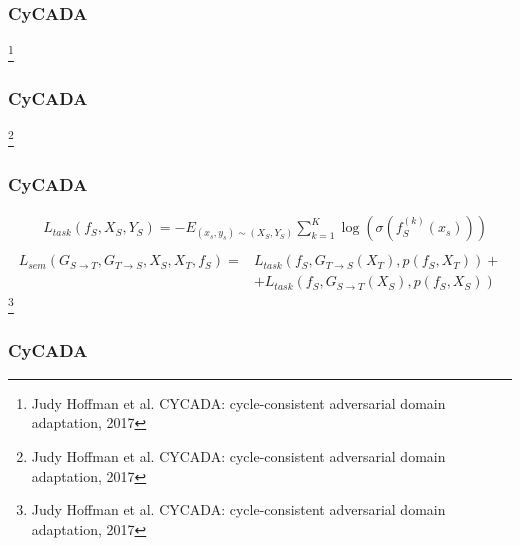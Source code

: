 \documentclass[14pt,aspectratio=169]{beamer}
\newcommand\blfootnote[1]{%
  \begingroup
  \renewcommand\thefootnote{}\footnote{#1}%
  \addtocounter{footnote}{-1}%
  \endgroup
}
\begin{document}
\begin{frame}
\frametitle{CyCADA}
\blfootnote{Judy Hoffman et al. CYCADA: cycle-consistent adversarial domain adaptation, 2017}
\end{frame}

\begin{frame}
\frametitle{CyCADA}
\blfootnote{Judy Hoffman et al. CYCADA: cycle-consistent adversarial domain adaptation, 2017}
\end{frame}

\begin{frame}
\frametitle{CyCADA}
\begin{align*}
  &L_{task}(f_S, X_S, Y_S) = -E_{(x_s, y_s)\sim(X_S, Y_S)}\sum_{k = 1}^K\log(\sigma(f_S^{(k)}(x_s)))\\
\end{align*}
\begin{align*}
  L_{sem}(G_{S\to T}, G_{T\to S}, X_S, X_T, f_S) = & L_{task}(f_S, G_{T\to S}(X_T), p(f_S, X_T)) +\\
  & + L_{task}(f_S, G_{S\to T}(X_S), p(f_S, X_S))
\end{align*}
\blfootnote{Judy Hoffman et al. CYCADA: cycle-consistent adversarial domain adaptation, 2017}
\end{frame}

\begin{frame}
\frametitle{CyCADA}
\end{frame}
\end{document}
